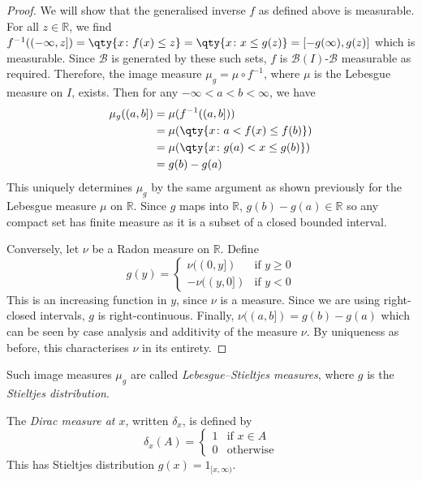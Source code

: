 \begin{proof}
	We will show that the generalised inverse $f$ as defined above is measurable.
	For all $z \in \mathbb R$, we find $f^{-1}((-\infty,z]) = \qty{x \colon f(x) \leq z} = \qty{x \colon x \leq g(z)} = [-g(\infty),g(z)]$ which is measurable.
	Since $\mathcal B$ is generated by these such sets, $f$ is $\mathcal B(I)$-$\mathcal B$ measurable as required.
	Therefore, the image measure $\mu_g = \mu \circ f^{-1}$, where $\mu$ is the Lebesgue measure on $I$, exists.
	Then for any $-\infty < a < b < \infty$, we have
	\begin{align*}
		\mu_g((a,b]) &= \mu(f^{-1}((a,b])) \\
		&= \mu(\qty{x \colon a < f(x) \leq f(b)}) \\
		&= \mu(\qty{x \colon g(a) < x \leq g(b)}) \\
		&= g(b) - g(a)
	\end{align*}
	This uniquely determines $\mu_g$ by the same argument as shown previously for the Lebesgue measure $\mu$ on $\mathbb R$.
	Since $g$ maps into $\mathbb R$, $g(b) - g(a) \in \mathbb R$ so any compact set has finite measure as it is a subset of a closed bounded interval.

	Conversely, let $\nu$ be a Radon measure on $\mathbb R$.
	Define
	\[ g(y) = \begin{cases}
		\nu((0,y]) & \text{if } y \geq 0 \\
		-\nu((y,0]) & \text{if } y < 0
	\end{cases} \]
	This is an increasing function in $y$, since $\nu$ is a measure.
	Since we are using right-closed intervals, $g$ is right-continuous.
	Finally, $\nu((a,b]) = g(b) - g(a)$ which can be seen by case analysis and additivity of the measure $\nu$.
	By uniqueness as before, this characterises $\nu$ in its entirety.
\end{proof}
\begin{remark}
	Such image measures $\mu_g$ are called \emph{Lebesgue--Stieltjes measures}, where $g$ is the \emph{Stieltjes distribution}.
\end{remark}
\begin{example}
	The \emph{Dirac measure at $x$}, written $\delta_x$, is defined by
	\[ \delta_x(A) = \begin{cases}
		1 & \text{if } x \in A \\
		0 & \text{otherwise}
	\end{cases} \]
	This has Stieltjes distribution $g(x) = 1_{[x,\infty)}$.
\end{example}

